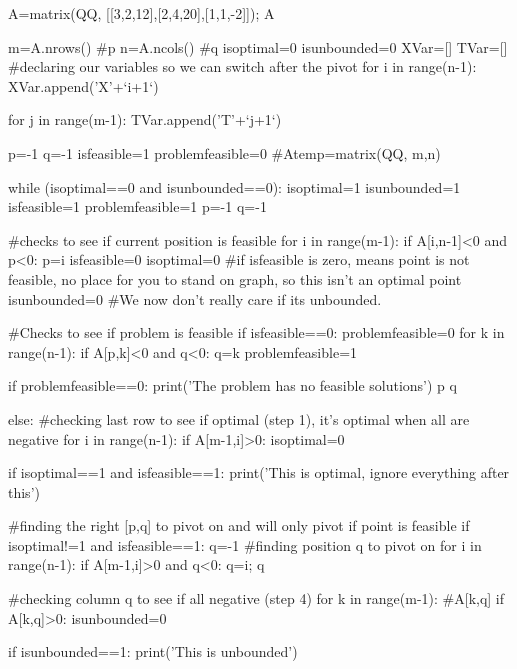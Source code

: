 \documentclass{ximera}
\begin{document}
 
\begin{sageCell}
A=matrix(QQ, [[3,2,12],[2,4,20],[1,1,-2]]); A



m=A.nrows()       #p
n=A.ncols()        #q
isoptimal=0
isunbounded=0
XVar=[]
TVar=[]
#declaring our variables so we can switch after the pivot
for i in range(n-1):
    XVar.append('X'+`i+1`)

for j in range(m-1):
    TVar.append('T'+`j+1`)

p=-1
q=-1
isfeasible=1
problemfeasible=0
#Atemp=matrix(QQ, m,n)


while (isoptimal==0 and isunbounded==0):
    isoptimal=1
    isunbounded=1
    isfeasible=1
    problemfeasible=1
    p=-1
    q=-1

    #checks to see if current position is feasible 
    for i in range(m-1):
        if A[i,n-1]<0 and p<0:
            p=i
            isfeasible=0
            isoptimal=0 #if isfeasible is zero, means point is not feasible, no place for you to stand on graph, so this isn't an optimal point
            isunbounded=0 #We now don't really care if its unbounded.
    
    #Checks to see if problem is feasible
    if isfeasible==0:  
        problemfeasible=0
        for k in range(n-1):
            if A[p,k]<0 and q<0:
                q=k
                problemfeasible=1


    if problemfeasible==0:
        print('The problem has no feasible solutions')
        p
        q

    else:
        #checking last row to see if optimal (step 1), it's optimal when all are negative
        for i in range(n-1):
            if A[m-1,i]>0:
                isoptimal=0

        if isoptimal==1 and isfeasible==1:
            print('This is optimal, ignore everything after this')
    

        #finding the right [p,q] to pivot on and will only pivot if point is feasible
        if isoptimal!=1 and isfeasible==1:
            q=-1
            #finding position q to pivot on
            for i in range(n-1):
                if A[m-1,i]>0 and q<0:
                    q=i; q
            
            #checking column q to see if all negative (step 4)
            for k in range(m-1):
                #A[k,q]
                if A[k,q]>0:
                    isunbounded=0
        
            if isunbounded==1:
                print('This is unbounded')
        

\end{sageCell}
\end{document}
